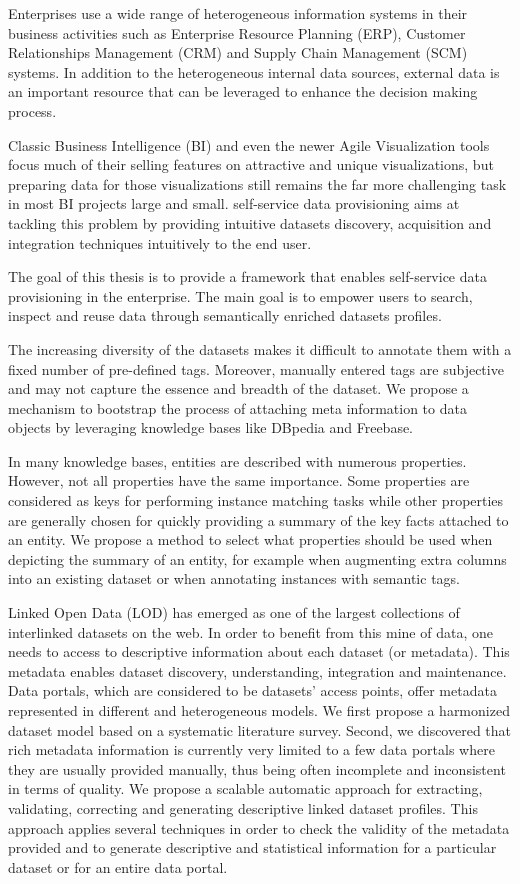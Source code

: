 Enterprises use a wide range of heterogeneous information systems in their business activities such as Enterprise Resource Planning (ERP), Customer Relationships Management (CRM) and Supply Chain Management (SCM) systems. In addition to the heterogeneous internal data sources, external data is an important resource that can be leveraged to enhance the decision making process.

Classic Business Intelligence (BI) and even the newer Agile Visualization tools focus much of their selling features on attractive and unique visualizations, but preparing data for those visualizations still remains the far more challenging task in most BI projects large and small. self-service data provisioning aims at tackling this problem by providing intuitive datasets discovery, acquisition and integration techniques intuitively to the end user.

The goal of this thesis is to provide a framework that enables self-service data provisioning in the enterprise. The main goal is to empower users to search, inspect and reuse data through semantically enriched datasets profiles.

The increasing diversity of the datasets makes it difficult to annotate them with a fixed number of pre-defined tags. Moreover, manually entered tags are subjective and may not capture the essence and breadth of the dataset. We propose a mechanism to bootstrap the process of attaching meta information to data objects by leveraging knowledge bases like DBpedia and Freebase.

In many knowledge bases, entities are described with numerous properties. However, not all properties have the same importance. Some properties are considered as keys for performing instance matching tasks while other properties are generally chosen for quickly providing a summary of the key facts attached to an entity. We propose a method to select what properties should be used when depicting the summary of an entity, for example when augmenting extra columns into an existing dataset or when annotating instances with semantic tags.

Linked Open Data (LOD) has emerged as one of the largest collections of interlinked datasets on the web. In order to benefit from this mine of data, one needs to access to descriptive information about each dataset (or metadata). This metadata enables dataset discovery, understanding, integration and maintenance. Data portals, which are considered to be datasets' access points, offer metadata represented in different and heterogeneous models. We first propose a harmonized dataset model based on a systematic literature survey. Second, we discovered that rich metadata information is currently very limited to a few data portals where they are usually provided manually, thus being often incomplete and inconsistent in terms of quality. We propose a scalable automatic approach for extracting, validating, correcting and generating descriptive linked dataset profiles. This approach applies several techniques in order to check the validity of the metadata provided and to generate descriptive and statistical information for a particular dataset or for an entire data portal.

